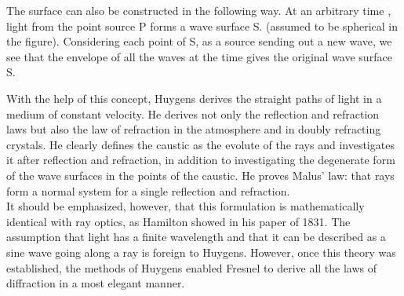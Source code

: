             The surface can also be constructed in the following way. At an arbitrary time , light from the point source P forms a wave surface S. (assumed to be spherical in the figure). Considering each point of S, as a source sending out a new wave, we see that the envelope of all the waves at the time gives the original wave surface S.
            
            With the help of this concept, Huygens derives the straight paths of light in a medium of constant velocity. He derives not only the reflection and refraction laws but also the law of refraction in the atmosphere and in doubly refracting crystals. He clearly defines the caustic as the evolute of the rays and investigates it after reflection and refraction, in addition to investigating the degenerate form of the wave surfaces in the points of the caustic. He proves Malus' law: that rays form a normal system for a single reflection and refraction.\\

            It should be emphasized, however, that this formulation is mathematically identical with ray optics, as Hamilton showed in his paper of 1831. The assumption that light has a finite wavelength and that it can be described as a sine wave going along a ray is foreign to Huygens. However, once this theory was established, the methods of Huygens enabled Fresnel to derive all the laws of diffraction in a most elegant manner.